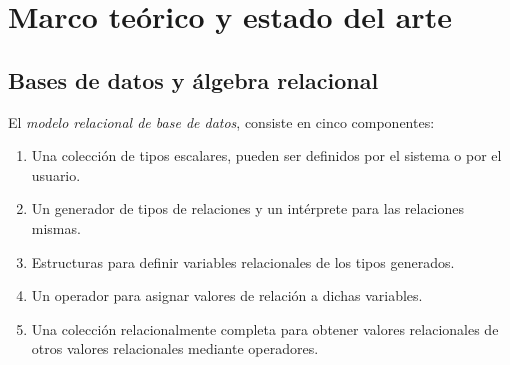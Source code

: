 \section {Marco teórico y estado del arte}\label{sec:marco}
\subsection {Bases de datos y álgebra relacional}\label{subsec:rdb}
El \emph{modelo relacional de base de datos}, consiste en cinco componentes:
\begin{enumerate}
	\item Una colección de tipos escalares, pueden ser definidos por el sistema o por el usuario.
	\item Un generador de tipos de relaciones y un intérprete para las relaciones mismas.
	\item Estructuras para definir variables relacionales de los tipos generados.
	\item Un operador para asignar valores de relación a dichas variables.
	\item Una colección relacionalmente completa para obtener valores relacionales de otros valores relacionales mediante operadores.
\end{enumerate}
